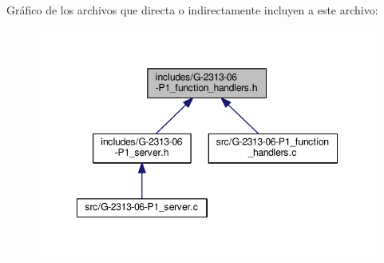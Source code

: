 Gráfico de los archivos que directa o indirectamente incluyen a este archivo\+:\nopagebreak
\begin{figure}[H]
\begin{center}
\leavevmode
\includegraphics[width=349pt]{G-2313-06-P1__function__handlers_8h__dep__incl}
\end{center}
\end{figure}
